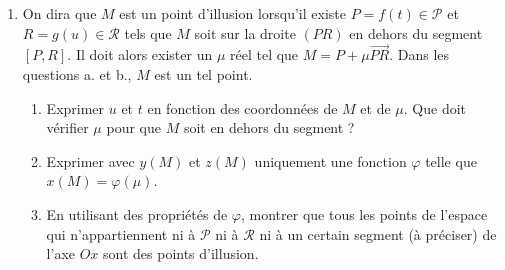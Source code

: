 \begin{enumerate}
\item On dira que $M$ est un point d'illusion lorsqu'il existe $P=f(t)\in \mathcal{P}$ et $R=g(u)\in \mathcal{R}$ tels que $M$ soit sur la droite $(PR)$ en dehors du segment $[P,R]$. Il doit alors exister un $\mu$ réel tel que $M=P+\mu \overrightarrow{PR}$.\newline
Dans les questions a. et b., $M$ est un tel point.
\begin{enumerate}
 \item Exprimer $u$ et $t$ en fonction des coordonnées de $M$ et de $\mu$. Que doit vérifier $\mu$ pour que $M$ soit en dehors du segment ?
 \item Exprimer avec $y(M)$ et $z(M)$ uniquement une fonction $\varphi$ telle que $x(M) = \varphi(\mu)$.
 \item En utilisant des propriétés de $\varphi$, montrer que tous les points de l'espace qui n'appartiennent ni à $\mathcal{P}$ ni à $\mathcal{R}$ ni à un certain segment (à préciser) de l'axe $Ox$ sont des points d'illusion.  
\end{enumerate}

\end{enumerate}
